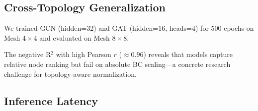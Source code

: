 \documentclass[conference]{IEEEtran}
\begin{document}
\subsection{Cross-Topology Generalization}

We trained GCN (hidden=32) and GAT (hidden=16, heads=4) for 500 epochs on Mesh $4\times4$ and evaluated on Mesh $8\times8$.

\begin{table}[h]
\centering
\caption{Cross-topology BC prediction (trained on Mesh $4\times4$)}
\label{tab:generalization}
\end{table}

The negative R$^2$ with high Pearson $r$ ($\approx 0.96$) reveals that models capture relative node ranking but fail on absolute BC scaling---a concrete research challenge for topology-aware normalization.

\subsection{Inference Latency}

\begin{table}[h]
\centering
\caption{GNN inference latency (Python/PyTorch, ARM Neoverse-N1)}
\label{tab:latency}
\end{table}
\end{document}
